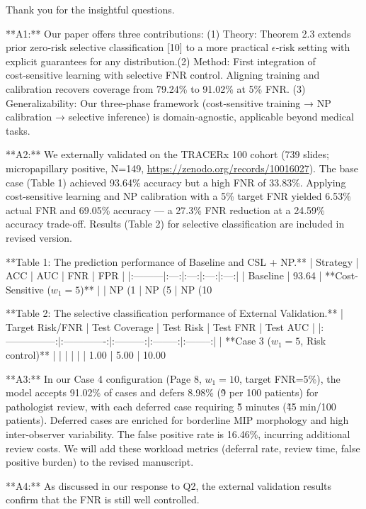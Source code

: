 Thank you for the insightful questions.

**A1:**  Our paper offers three contributions: (1) Theory: Theorem 2.3 extends prior zero‑risk selective classification [10] to a more practical $\epsilon$‑risk setting with explicit guarantees for any distribution.(2) Method: First integration of cost‑sensitive learning with selective FNR control. Aligning training and calibration recovers coverage from 79.24\% to 91.02\% at 5\% FNR. (3) Generalizability: Our three‑phase framework (cost‑sensitive training → NP calibration → selective inference) is domain‑agnostic, applicable beyond medical tasks. 

**A2:** We externally validated on the TRACERx 100 cohort (739 slides; micropapillary positive, N=149, \url{https://zenodo.org/records/10016027}). The base case (Table 1) achieved 93.64\% accuracy but a high FNR of 33.83\%. Applying cost-sensitive learning and NP calibration with a 5\% target FNR yielded 6.53\% actual FNR and 69.05\% accuracy — a 27.3\% FNR reduction at a 24.59\% accuracy trade-off. Results (Table 2) for selective classification are included in revised version. 

**Table 1: The prediction performance of Baseline and CSL + NP.**
| Strategy | ACC | AUC | FNR | FPR |
|:---------|:---:|:---:|:---:|:---:|
| Baseline | 93.64%
| **Cost-Sensitive ($w_{1}=5$)** |
| NP (1%
| NP (5%
| NP (10%

**Table 2: The selective classification performance of External Validation.**
| Target Risk/FNR | Test Coverage | Test Risk | Test FNR | Test AUC |
|:---------------:|:-------------:|:---------:|:--------:|:--------:|
| **Case 3 ($w_{1}=5$, Risk control)** | | | | |
| 1.00%
| 5.00%
| 10.00%

**A3:**  In our Case 4 configuration (Page 8, $w_{1}=10$, target FNR=5\%), the model accepts 91.02\% of cases and defers 8.98\% (\~9 per 100 patients) for pathologist review, with each deferred case requiring \~5 minutes (\~45 min/100 patients). Deferred cases are enriched for borderline MIP morphology and high inter-observer variability. The false positive rate is 16.46\%, incurring additional review costs. We will add these workload metrics (deferral rate, review time, false positive burden) to the revised manuscript.

**A4:**  As discussed in our response to Q2, the external validation results confirm that the FNR is still well controlled.